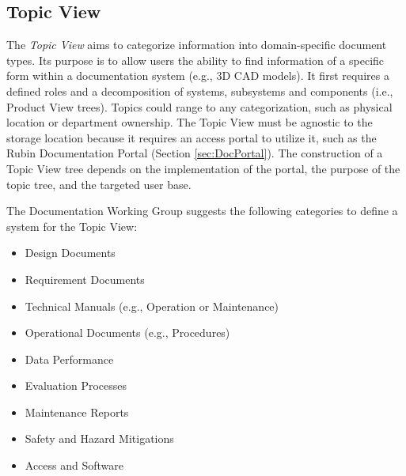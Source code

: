 \subsection{Topic View}

The \emph{Topic View} aims to categorize information into domain-specific document types.
Its purpose is to allow users the ability to find information of a specific form within a documentation system (e.g., 3D CAD models).
It first requires a defined roles and a decomposition of systems, subsystems and components (i.e., Product View trees).
Topics could range to any categorization, such as physical location or department ownership.
The Topic View must be agnostic to the storage location because it requires an access portal to utilize it, such as the Rubin Documentation Portal (Section \ref{sec:DocPortal}).
The construction of a Topic View tree depends on the implementation of the portal, the purpose of the topic tree, and the targeted user base.

The Documentation Working Group suggests the following categories to define a system for the Topic View:

\begin{itemize}
\item Design Documents
\item Requirement Documents
\item Technical Manuals (e.g., Operation or Maintenance)
\item Operational Documents (e.g., Procedures)
\item Data Performance
\item Evaluation Processes
\item Maintenance Reports
\item Safety and Hazard Mitigations
\item Access and Software
\end{itemize}

